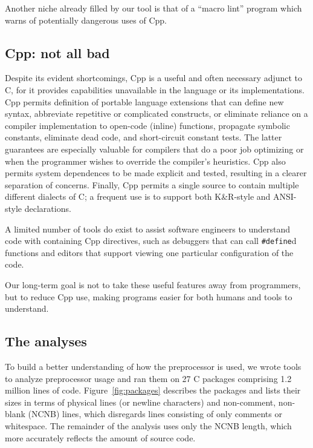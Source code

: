 \documentclass[11pt]{article}
\def\numpackages{27}
\def\numlines{1.2 million}
\begin{document}
Another niche already filled by our tool is that of a ``macro lint''
program which warns of potentially dangerous uses of Cpp.


\subsection{Cpp: not all bad}

Despite its evident shortcomings, Cpp is a useful and often necessary
adjunct to C, for it provides capabilities unavailable in the language or
its implementations.  Cpp permits definition of portable language
extensions that can define new syntax, abbreviate repetitive or complicated
constructs, or eliminate reliance on a compiler implementation to
open-code (inline) functions, propagate symbolic constants, eliminate dead
code, and short-circuit constant tests.  The latter guarantees are
especially valuable for compilers that do a poor job optimizing or when the
programmer wishes to override the compiler's heuristics.  Cpp also permits
system dependences to be made explicit and tested, resulting in a clearer
separation of concerns.  Finally, Cpp permits a single source to contain
multiple different dialects of C; a frequent use is to support both
K\&R-style and ANSI-style declarations.


A limited number of tools do exist to assist software engineers to
understand code with containing Cpp directives, such as debuggers that can
call {\tt \#define}d functions and editors that support viewing one
particular configuration of the code.

Our long-term goal is not to take these useful features away from
programmers, but to reduce Cpp use, making programs easier for both humans
and tools to understand.


\subsection{The analyses}

To build a better understanding of how the preprocessor is used,
we wrote tools to analyze preprocessor usage and ran them on {\numpackages}
C packages comprising {\numlines} lines of code.  Figure~\ref{fig:packages}
describes the packages and lists their sizes in terms of physical lines (or
newline characters) and non-comment, non-blank (NCNB) lines, which
disregards lines consisting of only comments or whitespace.  The remainder
of the analysis uses only the NCNB length, which more accurately reflects
the amount of source code.
\end{document}
